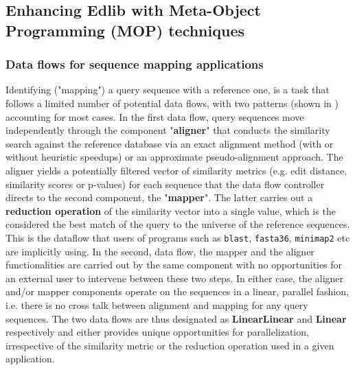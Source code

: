 \documentclass[10pt]{article}
\begin{document}
\newpage

\subsection{Enhancing Edlib with Meta-Object Programming (MOP) techniques}
\subsubsection{Data flows for sequence mapping applications}
Identifying ("mapping") a query sequence with a reference one, is a task that follows a limited number of potential data flows, with two patterns (shown in ) accounting for most cases. In the first data flow, query sequences move independently through the component "\textbf{aligner}" that conducts the similarity search against the reference database via an exact alignment method (with or without heuristic speedups) or an approximate pseudo-alignment approach\cite{bray_near-optimal_2016}. The aligner yields a potentially filtered vector of similarity metrics (e.g. edit distance, similarity scores or p-values) for each sequence that the data flow controller directs to the second component, the "\textbf{mapper}". The latter carries out a \textbf{reduction operation} of the similarity vector into a single value, which is the considered the best match of the query to the universe of the reference sequences. This is the dataflow that users of programs such as \texttt{blast}, \texttt{fasta36}, \texttt{minimap2} etc are implicitly using.  In the second, data flow, the mapper and the aligner functionalities are carried out by the same component with no opportunities for an external user to intervene between these two steps. In either case, the aligner and/or mapper components operate on the sequences in a linear, parallel fashion, i.e. there is no cross talk between alignment and mapping for any query sequences.  The two data flows are thus designated as \textbf{LinearLinear} and \textbf{Linear} respectively and either provides unique opportunities for parallelization, irrespective of the similarity metric or the reduction operation used in a given application.
\end{document}
